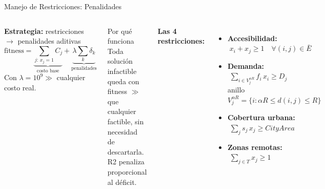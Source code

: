 \documentclass[aspectratio=169, 12pt]{beamer}
\newcommand{\acento}[1]{\textcolor{Verde}{\textbf{#1}}}
\newcommand{\gris}[1]{\textcolor{GrisAzul}{#1}}
\begin{document}
\begin{frame}{Manejo de Restricciones: Penalidades}
  \begin{columns}[T]
    \textbf{Estrategia:} restricciones $\rightarrow$ penalidades aditivas
    {\setlength\abovedisplayskip{3pt}\setlength\belowdisplayskip{3pt}
    \[
      \text{fitness} =
        \underbrace{\sum_{j:\,x_j=1}C_j}_{\text{costo base}}
        + \underbrace{\lambda\sum_k\delta_k}_{\text{penalidades}}
    \]
    }
    Con $\lambda = 10^9 \gg$ cualquier costo real.
    \vspace{0.3em}
    \begin{block}{Por qué funciona}
      \footnotesize Toda solución infactible queda con fitness $\gg$ que cualquier factible, sin necesidad de descartarla. R2 penaliza proporcional al déficit.
    \end{block}

    \textbf{Las 4 restricciones:}
    \vspace{0.3em}
    \begin{itemize}\footnotesize
      \item[\acento{R1}] \textbf{Accesibilidad:} $\;x_i + x_j \geq 1 \quad \forall(i,j)\in\bar{E}$
      \vspace{0.25em}
      \item[\acento{R2}] \textbf{Demanda:} $\;\sum_{i\in V_j^{\alpha R}} f_i\,x_i \geq D_j$ \\
        \gris{\scriptsize anillo $V_j^{\alpha R}=\{i : \alpha R \le d(i,j) \le R\}$}
      \vspace{0.25em}
      \item[\acento{R3}] \textbf{Cobertura urbana:} $\;\sum_{j} s_j\,x_j \geq \textit{CityArea}$
      \vspace{0.25em}
      \item[\acento{R4}] \textbf{Zonas remotas:} $\;\sum_{j\in T} x_j \geq 1$
    \end{itemize}
  \end{columns}
\end{frame}
\end{document}
